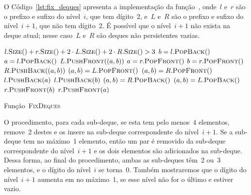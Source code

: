 \documentclass[main.tex]{subfiles}
\begin{document}
O Código~\ref{lst:fix_deques} apresenta a implementação da função~, onde~$l$ e~$r$ são o prefixo e sufixo do nível~$i$, que tem dígito~2, e~$L$ e~$R$ são o prefixo e sufixo do nível~$i+1$, que não tem dígito~2. É possível que o nível~$i+1$ não exista na deque atual; nesse caso~$L$ e~$R$ são deques não persistentes vazias.

\begin{algorithm}
\begin{algorithmic}[1]

\Require $l.\Call{Size}{\null} + r.\Call{Size}{\null} + 2\cdot L.\Call{Size}{\null} + 2\cdot R.\Call{Size}{\null} > 3$
     \label{line:fd:if5}
        \State $b = {l}.\Call{PopBack}{\null}$
        \State $a = {l}.\Call{PopBack}{\null}$
        \State ${L}.\Call{PushFront}{(a, b)}$
    \EndIf
     \label{line:fd:if6}
        \State $a = {r}.\Call{PopFront}{\null}$
        \State $b = {r}.\Call{PopFront}{\null}$
        \State ${R}.\Call{PushBack}{(a, b)}$
    \EndIf
     \label{line:fd:if3}
         \label{line:fd:if1}
            \State $(a, b) = {L}.\Call{PopFront}{\null}$
        \Else
            \State $(a, b) = {R}.\Call{PopFront}{\null}$
        \EndIf
        \State ${l}.\Call{PushBack}{a}$
        \State ${l}.\Call{PushBack}{b}$
    \EndIf
     \label{line:fd:if4}
         \label{line:fd:if2}
            \State $(a, b) = {R}.\Call{PopBack}{\null}$
        \Else
            \State $(a, b) = {L}.\Call{PopBack}{\null}$
        \EndIf
        \State ${r}.\Call{PushFront}{b}$
        \State ${r}.\Call{PushFront}{a}$
    \EndIf
\EndFunction

\end{algorithmic}
\caption{Função~\textsc{FixDeques}} \label{lst:fix_deques}
\end{algorithm}

O procedimento, para cada sub-deque, se esta tem pelo menos~4 elementos, remove~2 destes e os insere na sub-deque correspondente do nível~$i+1$. Se a sub-deque tem no máximo~1 elemento, então um par é removido da sub-deque correspondente do nível~$i+1$ e os dois elementos são adicionados na sub-deque. Dessa forma, ao final do procedimento, ambas as sub-deques têm~2 ou~3 elementos, e o dígito do nível~$i$ se torna~0. Também mostraremos que o dígito do nível~$i+1$ aumenta em no máximo~1, se esse nível não for o último e estiver vazio.
\end{document}
